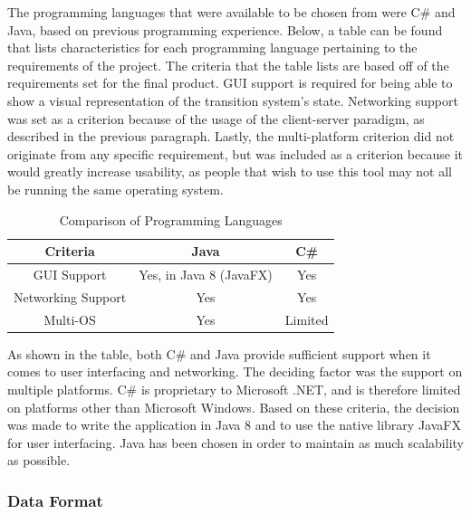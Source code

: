 \documentclass[11pt,a4paper]{article}
\begin{document}
The programming languages that were available to be chosen from were C\# and Java, based on previous programming experience. Below, a table can be found that lists characteristics for each programming language pertaining to the requirements of the project. The criteria that the table lists are based off of the requirements set for the final product. GUI support is required for being able to show a visual representation of the transition system's state. Networking support was set as a criterion because of the usage of the client-server paradigm, as described in the previous paragraph. Lastly, the multi-platform criterion did not originate from any specific requirement, but was included as a criterion because it would greatly increase usability, as people that wish to use this tool may not all be running the same operating system.
\begin{table}[h]
	\begin{center}
		\begin{tabular}{| c || c | c |}
			\hline
			Criteria & Java & C\# \\ \hline
			GUI Support & Yes, in Java 8 (JavaFX) & Yes \\ \hline
			Networking Support & Yes & Yes \\ \hline
			Multi-OS & Yes & Limited \\ \hline
		\end{tabular}
		\caption{Comparison of Programming Languages}
	\end{center}
\end{table}
\clearpage
As shown in the table, both C\# and Java provide sufficient support when it comes to user interfacing and networking. The deciding factor was the support on multiple platforms. C\# is proprietary to Microsoft .NET, and is therefore limited on platforms other than Microsoft Windows. Based on these criteria, the decision was made to write the application in Java 8 and to use the native library JavaFX for user interfacing. Java has been chosen in order to maintain as much scalability as possible.

\subsubsection{Data Format}
\end{document}
